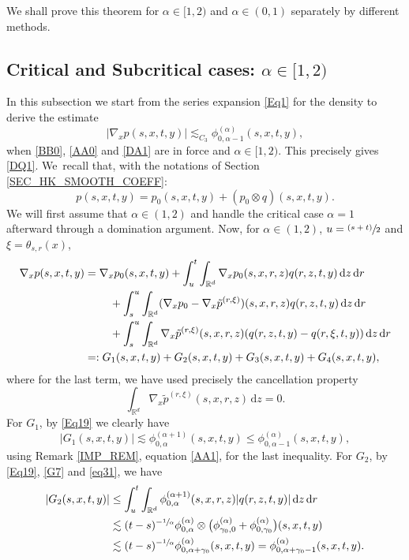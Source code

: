 \documentclass[JEP,XML,SOM,Unicode,published]{cedram}
\newcommand{\psfrac}[2]{\sfrac{(#1)}{#2}}
\theoremstyle{plain}
\theoremstyle{definition}
\newcommand\mR{\mathbb{R}}
\newcommand\1{{\mathbf{1}}}
\newcommand{\dif}{\,\mathrm{d}}
\begin{document}
We shall prove this theorem for $\alpha\in[1,2)$ and $\alpha\in(0,1)$ separately by different methods.

\subsection{Critical and Subcritical cases: $\alpha\in[1,2)$}
In this subsection we start from the series expansion \eqref{Eq1} for the density to derive the estimate
\begin{equation}\label{GR}
|\nabla_x p(s,x,t,y)|\lesssim_{C_3}\phi^{(\alpha)}_{0,\alpha-1}(s,x,t,y),
\end{equation}
when \eqref{BB0}, \eqref{AA0} and \eqref{DA1} are in force and $\alpha\in[1,2)$.
{This precisely gives \eqref{DQ1}}. We~recall that, with the notations of Section \ref{SEC_HK_SMOOTH_COEFF}:
\[
p(s,x,t,y)=p_0(s,x,t,y)+(p_0\otimes q)(s,x,t,y).
\]
{We will first assume that $\alpha\in (1,2) $ and handle the critical case $\alpha=1 $ afterward through a domination argument.
Now, for $\alpha\in (1,2) $}, $u=\psfrac{s+t}{2}$ and $\xi=\theta_{s,r}(x)$,
\begin{equation}\label{CUT_GRAD_SUB_CRITICAL}
\begin{aligned}
\nabla_x p(s,x,t,y)&=\nabla_xp_0(s,x,t,y)
+\int_{u}^{t} \int_{\mR^d}\nabla_x {p}_0(s,x,r,z)q(r,z,t,y)\dif z \dif r\\
&\hspace*{.8cm}+\int_s^u\int_{\mR^d}(\nabla_x {p}_0-\nabla_x \tilde{p}^{(r,\xi)})(s,x,r,z)q(r,z,t,y)\dif z \dif r\\
&\hspace*{.8cm} + \int_s^u\int_{\mR^d}\nabla_x\tilde{p}^{(r,\xi)}(s,x,r,z)(q(r,z,t,y)-q(r,\xi,t,y))\dif z \dif r\\
&=:G_1(s,x,t,y)+G_2(s,x,t,y)+G_3(s,x,t,y)+G_4(s,x,t,y),
\end{aligned}
\end{equation}
where for the last term, we have used precisely the cancellation property
\[
\int_{\mR^d} \nabla_x\tilde{p}^{({r},\xi)}(s,x,r,z)\dif z=0.
\]
For $G_1$, by \eqref{Eq19} we clearly have
\[
|G_1(s,x,t,y)|\lesssim \phi^{(\alpha+1)}_{0,\alpha}(s,x,t,y)\leq\phi^{(\alpha)}_{0,\alpha-1}(s,x,t,y),
\]
using Remark \ref{IMP_REM}, equation \eqref{AA1}, for the last inequality.
For $G_2$, by \eqref{Eq19}, \eqref{G7} and \eqref{eq31}, we have
\begin{align*}
|G_2(s,x,t,y)|
&\le \int_u^t\int_{\mR^d } \phi_{0,\alpha}^{(\alpha+1)}(s,x,r,z) |q(r,z,t,y)|\dif z\dif r\\
&\lesssim (t-s)^{- \sfrac 1\alpha}\phi_{0,\alpha}^{(\alpha)}\otimes\bigl(\phi_{\gamma_0,0}^{(\alpha)} +\phi_{0,\gamma_0}^{(\alpha)}\bigr)(s,x,t,y)\\
&\lesssim (t-s)^{-\sfrac1\alpha} \phi_{0,\alpha+\gamma_0}^{(\alpha)}(s,x,t,y)=\phi_{0,\alpha+\gamma_0-1}^{(\alpha)}(s,x,t,y).
\end{align*}
\end{document}

